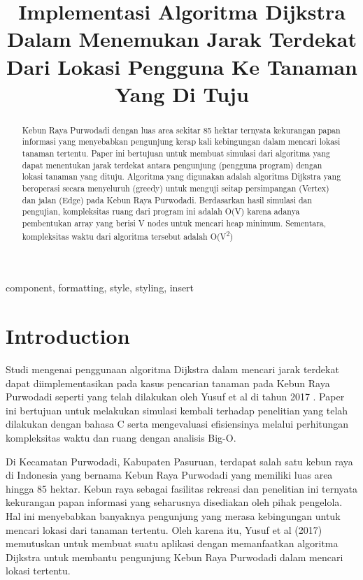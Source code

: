 \documentclass[conference]{IEEEtran}
\title{Implementasi Algoritma Dijkstra Dalam
Menemukan Jarak Terdekat Dari Lokasi Pengguna
Ke Tanaman Yang Di Tuju}
\author{\IEEEauthorblockN{Raihan Fadhil Yanuarsyah}
\IEEEauthorblockA{\textit{School of Electrical Engineering and Informatics}\\
\textit{Institut Teknologi Bandung}\\
Bandung, Indonesia\\
13220049@std.stei.itb.ac.id}
}
\begin{document}
\maketitle

\begin{abstract}
    Kebun Raya Purwodadi dengan luas area sekitar 85 hektar ternyata kekurangan papan informasi 
    yang menyebabkan pengunjung kerap kali kebingungan dalam mencari lokasi tanaman tertentu. 
    Paper ini bertujuan untuk membuat simulasi dari algoritma yang dapat menentukan jarak terdekat 
    antara pengunjung (pengguna program) dengan lokasi tanaman yang dituju. Algoritma yang digunakan 
    adalah algoritma Dijkstra yang beroperasi secara menyeluruh (greedy) untuk menguji seitap persimpangan 
    (Vertex) dan jalan (Edge) pada Kebun Raya Purwodadi. Berdasarkan hasil simulasi dan pengujian, 
    kompleksitas ruang dari program ini adalah O(V) karena adanya pembentukan array yang berisi V nodes 
    untuk mencari heap minimum. Sementara, kompleksitas waktu dari algoritma tersebut adalah O(V\textsuperscript{2})
\end{abstract}
    
\begin{IEEEkeywords}
component, formatting, style, styling, insert
\end{IEEEkeywords}

\section{Introduction}
Studi mengenai penggunaan algoritma Dijkstra dalam mencari jarak terdekat dapat diimplementasikan pada kasus pencarian tanaman pada Kebun Raya Purwodadi seperti yang telah dilakukan oleh Yusuf et al di tahun 2017 \cite{yusuf2017implementasi}. 
Paper ini bertujuan untuk melakukan simulasi kembali terhadap penelitian yang telah dilakukan dengan bahasa C serta mengevaluasi efisiensinya melalui perhitungan kompleksitas waktu dan ruang dengan analisis Big-O.

Di Kecamatan Purwodadi, Kabupaten Pasuruan, terdapat salah satu kebun raya di Indonesia yang bernama Kebun Raya Purwodadi yang memiliki luas area hingga 85 hektar. Kebun raya sebagai fasilitas rekreasi dan penelitian ini ternyata kekurangan papan informasi yang seharusnya disediakan oleh pihak pengelola. Hal ini menyebabkan banyaknya pengunjung yang merasa kebingungan untuk mencari lokasi dari tanaman tertentu. Oleh karena itu, Yusuf et al (2017) memutuskan untuk membuat suatu aplikasi dengan memanfaatkan algoritma Dijkstra untuk membantu pengunjung Kebun Raya Purwodadi dalam mencari lokasi tertentu.
\end{document}
